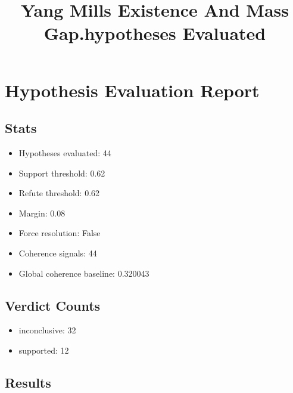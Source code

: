 \documentclass[
]{article}
\title{Yang Mills Existence And Mass Gap.hypotheses Evaluated}
\author{}
\date{}
\providecommand{\tightlist}{%
  \setlength{\itemsep}{0pt}\setlength{\parskip}{0pt}}
\begin{document}
\maketitle

\section{Hypothesis Evaluation
Report}\label{hypothesis-evaluation-report}

\subsection{Stats}\label{stats}

\begin{itemize}
\tightlist
\item
  Hypotheses evaluated: 44
\item
  Support threshold: 0.62
\item
  Refute threshold: 0.62
\item
  Margin: 0.08
\item
  Force resolution: False
\item
  Coherence signals: 44
\item
  Global coherence baseline: 0.320043
\end{itemize}

\subsection{Verdict Counts}\label{verdict-counts}

\begin{itemize}
\tightlist
\item
  inconclusive: 32
\item
  supported: 12
\end{itemize}

\subsection{Results}\label{results}
\end{document}
